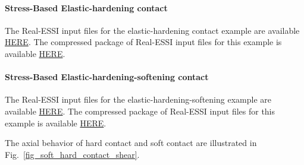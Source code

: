 \paragraph{Stress-Based Elastic-hardening contact}

The Real-ESSI input files for the elastic-hardening contact example are available 
\href{https://github.com/yuan-energy/Real-ESSI-Short-Course-Examples/tree/master/short-course-examples/Day3/Contact_Examples/shear/SoftContact_Nonlinear_Hardening_Shear_Model}{HERE}. 
The compressed package of Real-ESSI input files for this example is available 
\href{https://github.com/yuan-energy/Real-ESSI-Short-Course-Examples/blob/master/short-course-examples/Day3/Contact_Examples/shear/SoftContact_Nonlinear_Hardening_Shear_Model/SoftContact_Nonlinear_Hardening_Shear_Model.tgz?raw=true}{HERE}. 



\paragraph{Stress-Based Elastic-hardening-softening contact}

The Real-ESSI input files for the elastic-hardening-softening example are available 
\href{https://github.com/yuan-energy/Real-ESSI-Short-Course-Examples/tree/master/short-course-examples/Day3/Contact_Examples/shear/SoftContact_Nonlinear_Hardening_Softening_Shear_Model}{HERE}. 
The compressed package of Real-ESSI input files for this example is available 
\href{https://github.com/yuan-energy/Real-ESSI-Short-Course-Examples/blob/master/short-course-examples/Day3/Contact_Examples/shear/SoftContact_Nonlinear_Hardening_Softening_Shear_Model/SoftContact_Nonlinear_Hardening_Softening_Shear_Model.tgz?raw=true}{HERE}. 



The axial behavior of hard contact and soft contact are illustrated in Fig.~\ref{fig_soft_hard_contact_shear}.


